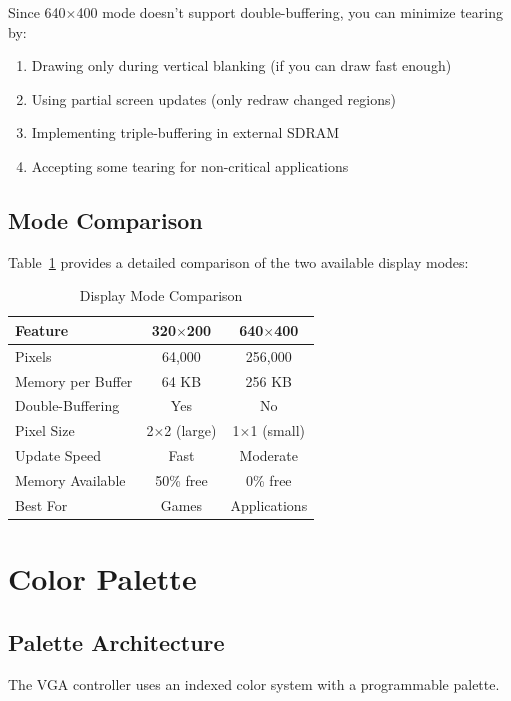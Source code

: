 \documentclass[11pt,letterpaper]{report}
\begin{document}
Since 640$\times$400 mode doesn't support double-buffering, you can minimize tearing by:

\begin{enumerate}
    \item Drawing only during vertical blanking (if you can draw fast enough)
    \item Using partial screen updates (only redraw changed regions)
    \item Implementing triple-buffering in external SDRAM
    \item Accepting some tearing for non-critical applications
\end{enumerate}

\section{Mode Comparison}

Table~\ref{tab:mode_compare} provides a detailed comparison of the two available display modes:

\begin{table}[tbp]
\centering
\caption{Display Mode Comparison}
\label{tab:mode_compare}
\begin{tabular}{lcc}
\toprule
\textbf{Feature} & \textbf{320$\times$200} & \textbf{640$\times$400} \\
\midrule
Pixels & 64,000 & 256,000 \\
Memory per Buffer & 64 KB & 256 KB \\
Double-Buffering & Yes & No \\
Pixel Size & 2$\times$2 (large) & 1$\times$1 (small) \\
Update Speed & Fast & Moderate \\
Memory Available & 50\% free & 0\% free \\
Best For & Games & Applications \\
\bottomrule
\end{tabular}
\end{table}

\chapter{Color Palette}

\section{Palette Architecture}

The VGA controller uses an indexed color system with a programmable palette.
\end{document}
